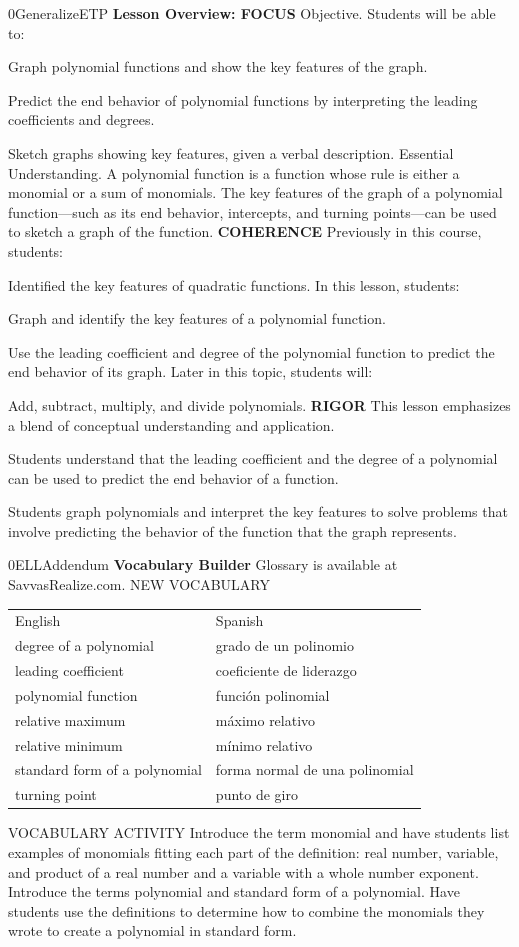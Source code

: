 \documentclass{article}
\newenvironment{te-addendum}[2]{}{}     %
\newcommand{\te}[1]{}                   %
\begin{document}
\begin{te-addendum}{0}{GeneralizeETP}
\textbf{Lesson Overview: FOCUS}
Objective. Students will be able to:
\item Graph polynomial functions and show the key features of the graph.
\item Predict the end behavior of polynomial functions by interpreting the leading coefficients and degrees.
\item Sketch graphs showing key features, given a verbal description.
Essential Understanding. A polynomial function is a function whose rule is either a monomial or a sum of monomials. The key features of the graph of a polynomial function---such as its end behavior, intercepts, and turning points---can be used to sketch a graph of the function.
\textbf{COHERENCE}
Previously in this course, students:
\item Identified the key features of quadratic functions.
In this lesson, students:
\item Graph and identify the key features of a polynomial function.
\item Use the leading coefficient and degree of the polynomial function to predict the end behavior of its graph.
Later in this topic, students will:
\item Add, subtract, multiply, and divide polynomials.
\textbf{RIGOR}
This lesson emphasizes a blend of conceptual understanding and application.
\item Students understand that the leading coefficient and the degree of a polynomial can be used to predict the end behavior of a function.
\item Students graph polynomials and interpret the key features to solve problems that involve predicting the behavior of the function that the graph represents.
\te{Program Resources. SavvasRealize.com.}
\end{te-addendum}
\begin{te-addendum}{0}{ELLAddendum}
\textbf{Vocabulary Builder}
Glossary is available at SavvasRealize.com.
NEW VOCABULARY
\begin{tabular}{ll}
English & Spanish \\
degree of a polynomial & grado de un polinomio \\
leading coefficient & coeficiente de liderazgo \\
polynomial function & función polinomial \\
relative maximum & máximo relativo \\
relative minimum & mínimo relativo \\
standard form of a polynomial & forma normal de una polinomial \\
turning point & punto de giro \\
\end{tabular}
VOCABULARY ACTIVITY
Introduce the term monomial and have students list examples of monomials fitting each part of the definition: real number, variable, and product of a real number and a variable with a whole number exponent. Introduce the terms polynomial and standard form of a polynomial. Have students use the definitions to determine how to combine the monomials they wrote to create a polynomial in standard form.
\end{te-addendum}
\end{document}
